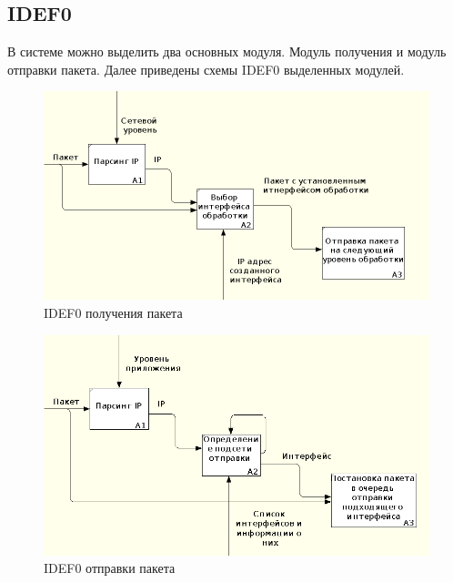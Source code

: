 \documentclass[14pt, a4paper]{extarticle}
\begin{document}
\subsection{IDEF0}
В системе можно выделить два основных модуля. Модуль получения и модуль отправки пакета. Далее приведены схемы IDEF0 выделенных модулей.
\begin{figure}[H]
	\centering
	\includegraphics[scale=0.7]{idefin.png}
	\caption{IDEF0 получения пакета}
	\label{idefin}
\end{figure}
\begin{figure}[H]
	\centering
	\includegraphics[scale=0.7]{idefout.png}
	\caption{IDEF0 отправки пакета}
	\label{idefout}
\end{figure}
\end{document}
